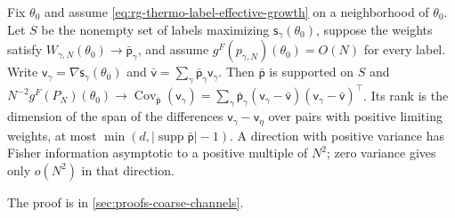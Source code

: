 \label{eq:rg-thermo-label-tie-direction}
\label{eq:rg-thermo-label-tie-limit}
Fix $\theta_0$ and assume \eqref{eq:rg-thermo-label-effective-growth} on a neighborhood of
$\theta_0$. Let $S$ be the nonempty set of labels maximizing $\mathsf s_\gamma(\theta_0)$, suppose
the weights satisfy $W_{\gamma,N}(\theta_0)\to\bar{\mathsf p}_\gamma$, and assume
$g^F(p_{\gamma,N})(\theta_0)=O(N)$ for every label. Write
$\mathsf v_\gamma=\nabla\mathsf s_\gamma(\theta_0)$ and
$\bar{\mathsf v}=\sum_\gamma\bar{\mathsf p}_\gamma\mathsf v_\gamma$. Then $\bar{\mathsf p}$ is
supported on $S$ and $N^{-2}g^F(P_N)(\theta_0)\to\operatorname{Cov}_{\bar{\mathsf p}}(\mathsf v_\gamma)
=\sum_\gamma\bar{\mathsf p}_\gamma(\mathsf v_\gamma-\bar{\mathsf v})(\mathsf v_\gamma-\bar{\mathsf v})^\top$.
Its rank is the dimension of the span of the differences $\mathsf v_\gamma-\mathsf v_\eta$ over
pairs with positive limiting weights, at most
$\min(d,\lvert\operatorname{supp}\bar{\mathsf p}\rvert-1)$. A direction with positive variance has
Fisher information asymptotic to a positive multiple of $N^2$; zero variance gives only $o(N^2)$ in
that direction. 

The proof is in \cref{sec:proofs-coarse-channels}.

